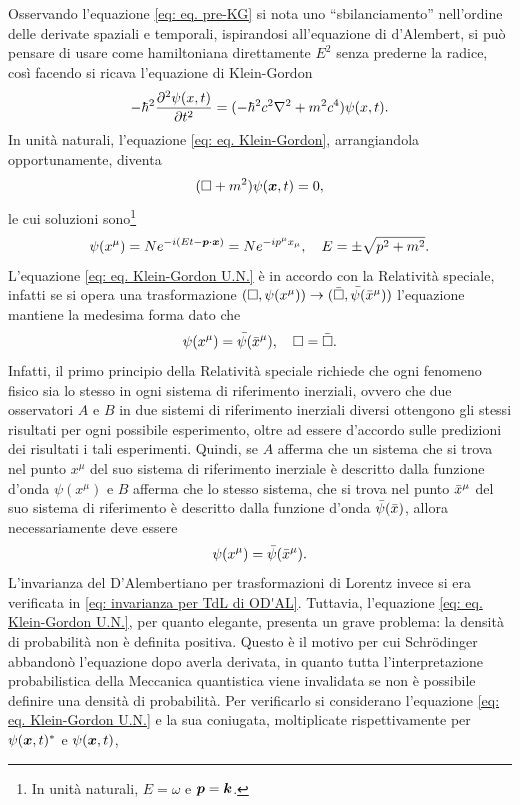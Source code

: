 Osservando l'equazione \eqref{eq: eq. pre-KG} si nota uno ``sbilanciamento'' nell'ordine delle derivate spaziali e temporali, ispirandosi all'equazione di d'Alembert, si può pensare di usare come hamiltoniana direttamente $E^2$ senza prederne la radice, così facendo si ricava l'equazione di Klein-Gordon
\begin{equation}
\label{eq: eq. Klein-Gordon}
    -\hbar^2\frac{\partial^2\psi(x,t)}{\partial t^2}=(-\hbar^2c^2\nabla^2+m^2c^4)\psi(x,t).
\end{equation}
In unità naturali, l'equazione \eqref{eq: eq. Klein-Gordon}, arrangiandola opportunamente, diventa
\begin{equation}
\label{eq: eq. Klein-Gordon U.N.}
    (\square+m^2)\psi(\bm{x},t)=0,
\end{equation}
le cui soluzioni sono\footnote{In unità naturali, $E=\omega$ e $\bm{p}=\bm{k}$.}
\begin{equation}
    \psi(x^\mu)=Ne^{-i(Et-\bm{p}\cdot\bm{x})}=Ne^{-ip^\mu x_\mu},\quad E=\pm\sqrt{p^2+m^2}.
\end{equation}
L'equazione \eqref{eq: eq. Klein-Gordon U.N.} è in accordo con la Relatività speciale, infatti se si opera una trasformazione $(\square,\psi(x^\mu))\to(\bar{\square},\bar{\psi(}\bar{x}^\mu))$ l'equazione mantiene la medesima forma dato che 
\begin{equation}
    \psi(x^\mu) = \bar{\psi(}\bar{x}^\mu),\quad \square = \bar{\square}.
\end{equation}
Infatti, il primo principio della Relatività speciale richiede che ogni fenomeno fisico sia lo stesso in ogni sistema di riferimento inerziali, ovvero che due osservatori $A$ e $B$ in due sistemi di riferimento inerziali diversi ottengono gli stessi risultati per ogni possibile esperimento, oltre ad essere d'accordo sulle predizioni dei risultati i tali esperimenti. Quindi, se $A$ afferma che un sistema che si trova nel punto $x^\mu$ del suo sistema di riferimento inerziale è descritto dalla funzione d'onda $\psi(x^\mu)$ e $B$ afferma che lo stesso sistema, che si trova nel punto $\bar{x}^\mu$ del suo sistema di riferimento è descritto dalla funzione d'onda $\bar{\psi}(\bar{x})$, allora necessariamente deve essere 
\begin{equation}
    \psi(x^\mu) = \bar{\psi}(\bar{x}^\mu).
\end{equation}
L'invarianza del D'Alembertiano per trasformazioni di Lorentz invece si era verificata in \eqref{eq: invarianza per TdL di OD'AL}. Tuttavia, l'equazione \eqref{eq: eq. Klein-Gordon U.N.}, per quanto elegante, presenta un grave problema: la densità di probabilità non è definita positiva. Questo è il motivo per cui Schr\"odinger abbandonò l'equazione dopo averla derivata, in quanto tutta l'interpretazione probabilistica della Meccanica quantistica viene invalidata se non è possibile definire una densità di probabilità. Per verificarlo si considerano l'equazione \eqref{eq: eq. Klein-Gordon U.N.} e la sua coniugata, moltiplicate rispettivamente per $\psi(\bm{x},t)^*$ e $\psi(\bm{x},t)$, 
